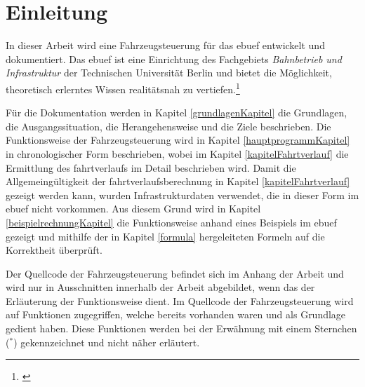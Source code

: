 \section{Einleitung}
\acresetall
In dieser Arbeit wird eine Fahrzeugsteuerung für das \ac{ebuef} entwickelt und dokumentiert. Das \ac{ebuef} ist eine Einrichtung des Fachgebiets \textit{Bahnbetrieb und Infrastruktur} der Technischen Universität Berlin und bietet die Möglichkeit, theoretisch erlerntes Wissen realitätsnah zu vertiefen.\footnote{\cite{ebuef}}

Für die Dokumentation werden in Kapitel \ref{grundlagenKapitel} die Grundlagen, die Ausgangssituation, die Herangehensweise und die Ziele beschrieben. Die Funktionsweise der Fahrzeugsteuerung wird in Kapitel \ref{hauptprogrammKapitel} in chronologischer Form beschrieben, wobei im Kapitel \ref{kapitelFahrtverlauf} die Ermittlung des \Gls{fahrtverlauf}s im Detail beschrieben wird. Damit die Allgemeingültigkeit der \Gls{fahrtverlauf}sberechnung in Kapitel \ref{kapitelFahrtverlauf} gezeigt werden kann, wurden Infrastrukturdaten verwendet, die in dieser Form im \ac{ebuef} nicht vorkommen. Aus diesem Grund wird in Kapitel \ref{beispielrechnungKapitel} die Funktionsweise anhand eines Beispiels im \ac{ebuef} gezeigt und mithilfe der in Kapitel \ref{formula} hergeleiteten Formeln auf die Korrektheit überprüft.

Der Quellcode der Fahrzeugsteuerung befindet sich im Anhang der Arbeit und wird nur in Ausschnitten innerhalb der Arbeit abgebildet, wenn das der Erläuterung der Funktionsweise dient. Im Quellcode der Fahrzeugsteuerung wird auf Funktionen zugegriffen, welche bereits vorhanden waren und als Grundlage gedient haben. Diese Funktionen werden bei der Erwähnung mit einem Sternchen ($^\ast$) gekennzeichnet und nicht näher erläutert.